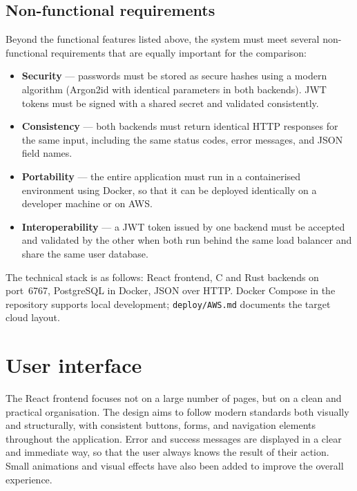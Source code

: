\subsection{Non-functional requirements}
\label{sec:ch2sec1sub2}

\par Beyond the functional features listed above, the system must meet several 
non-functional requirements that are equally important for the comparison:

\begin{itemize}
    \item \textbf{Security} --- passwords must be stored as secure hashes using 
    a modern algorithm (Argon2id with identical parameters in both backends). 
    JWT tokens must be signed with a shared secret and validated consistently.
    \item \textbf{Consistency} --- both backends must return identical HTTP 
    responses for the same input, including the same status codes, error 
    messages, and JSON field names.
    \item \textbf{Portability} --- the entire application must run in a 
    containerised environment using Docker, so that it can be deployed 
    identically on a developer machine or on AWS.
    \item \textbf{Interoperability} --- a JWT token issued by one backend must 
    be accepted and validated by the other when both run behind the same 
    load balancer and share the same user database.
\end{itemize}

\par The technical stack is as follows: React frontend, C and Rust backends on 
port~6767, PostgreSQL in Docker, JSON over HTTP. Docker Compose in the repository 
supports local development; \texttt{deploy/AWS.md} documents the target cloud layout.

\section{User interface}
\label{sec:ch2sec2}

\par The React frontend focuses not on a large number of pages, but on a clean and practical organisation. The design aims to follow modern standards both visually and structurally, with consistent buttons, forms, and navigation elements throughout the application. Error and success messages are displayed in a clear and immediate way, so that the user always knows the result of their action. Small animations and visual effects have also been added to improve the overall experience.

